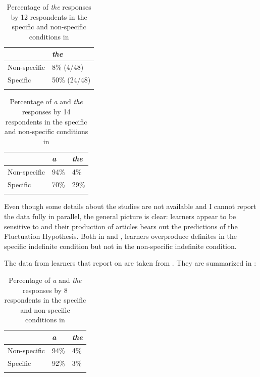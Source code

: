 \documentclass[output=paper,
modfonts
]{langscibook}
\begin{document}
\begin{table}[h]
\begin{tabularx}{.5\textwidth}{XX}
\lsptoprule
 &  \textit{the} \\
\midrule
Non-specific & 8\% (4/48) \\
Specific & 50\% (24/48) \\
\lspbottomrule
\end{tabularx}
\caption{Percentage of \textit{the} responses by 12  respondents in the specific and non-specific conditions in \citet{Hawkinsetal2006}}
\label{tab:lebruyn:3}
\end{table}

\begin{table}[h]
\begin{tabularx}{.66\textwidth}{lXX}
\lsptoprule
 & \textit{a} & \textit{the} \\
\midrule
{Non-specific} & 94\% & 4\%  \\
Specific & 70\% & 29\% \\
\lspbottomrule
\end{tabularx}
\caption{Percentage of \textit{a} and \textit{the} responses by 14  respondents in the specific and non-specific conditions in \citet{Reidetal2006}}
\label{tab:lebruyn:4}
\end{table}
\newpage
Even though some details about the studies are not available and I cannot report the data fully in parallel, the general picture is clear:  learners appear to be sensitive to  and their production of  articles bears out the predictions of the Fluctuation Hypothesis. Both in \citet{Hawkinsetal2006} and \citet{Reidetal2006},  learners overproduce definites in the specific indefinite condition but not in the non-specific indefinite condition.

The data from  learners that \citet{SnapeLeungTing2006} report on are taken from \citet{Ting2005}. They are summarized in :

\begin{table}[h]
\begin{tabularx}{.66\textwidth}{lXX}
\lsptoprule
 & \textit{a} & \textit{the} \\
\midrule
Non-specific & 94\% & 4\%  \\
Specific & 92\% & 3\% \\
\lspbottomrule
\end{tabularx}
\caption{Percentage of \textit{a} and \textit{the} responses by 8  respondents in the specific and non-specific conditions in \citet{Ting2005}}
\label{tab:lebruyn:5}
\end{table}
\end{document}
